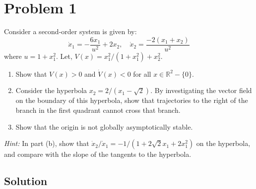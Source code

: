 \section*{Problem 1}

Consider a second-order system is given by:
\begin{equation*}
    \dot{x}_{1}=-\frac{6 x_{1}}{u^{2}}+2 x_{2}, \quad \dot{x}_{2}=\frac{-2\left(x_{1}+x_{2}\right)}{u^{2}}
\end{equation*}
where \( u=1+x_{1}^{2} \). Let, \( V(x)=x_{1}^{2} /\left(1+x_{1}^{2}\right)+x_{2}^{2} \).
\begin{enumerate}[label= (\alph*)]
    \item Show that \( V(x)>0 \) and \( \dot{V}(x)<0 \) for all \( x \in \mathbb{R}^{2}-\{0\} \).
    \item Consider the hyperbola \( x_{2}=2 /\left(x_{1}-\sqrt{2}\right) \).
          By investigating the vector field on the boundary of this hyperbola, show that trajectories to the right of the branch in the first quadrant cannot cross that branch.
    \item Show that the origin is not globally asymptotically stable.
\end{enumerate}
\textit{Hint:} In part (b), show that \( \dot{x}_{2} / \dot{x}_{1}=-1 /\left(1+2 \sqrt{2} x_{1}+2 x_{1}^{2}\right) \) on the hyperbola, and compare with the slope of the tangents to the hyperbola.

\subsection*{Solution}
